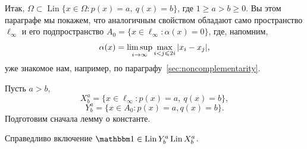 Итак, $\Omega \subset \operatorname{Lin}\{x\in\Omega : p(x) = a,~ q(x) = b\}$, где $1\geq a>b\geq 0$.
Вы этом параграфе мы покажем, что аналогичным свойством обладают само пространство $\ell_\infty$
и его подпространство
$A_0 = \{ x \in \ell_\infty : \alpha(x) =0 \}$,
где, напомним,
\begin{equation*}
	\alpha(x) = \varlimsup_{i\to\infty} \max_{i<j\leqslant 2i} |x_i - x_j|
	,
\end{equation*}
уже знакомое нам, например, по параграфу~\ref{sec:noncomplementarity}.


Пусть $a>b$,
\begin{equation}
	X^a_b = \{x\in\ell_\infty : p(x) = a,~ q(x) = b\}
	,
\end{equation}
\begin{equation}
	Y^a_b = \{x\in A_0 : p(x) = a, q(x) = b\}
	.
\end{equation}
Подготовим сначала лемму о константе.

\begin{lemma}
	\label{lem:const_Lin_alpha_0}
	Справедливо включение
	$\one\in \operatorname{Lin} Y^a_b \operatorname{Lin} X^a_b$.
\end{lemma}


